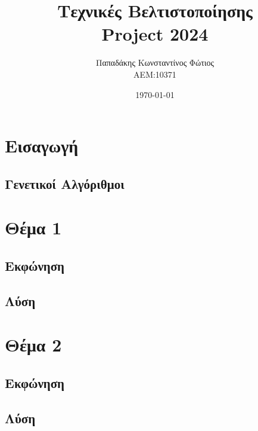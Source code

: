 \documentclass[twocolumn]{report}
\begin{document}

\title{\Huge \bfseries Τεχνικές Βελτιστοποίησης \\ Project 2024} %
\author{Παπαδάκης Κωνσταντίνος Φώτιος\vspace{0.5cm} \\  ΑΕΜ:10371} %
\date{\today}
\maketitle

\tableofcontents

\chapter{Εισαγωγή}
\section{Γενετικοί Αλγόριθμοι}


% 
\chapter{Θέμα 1}
\section{Εκφώνηση}

\section{Λύση}


% 
\chapter{Θέμα 2}
\section{Εκφώνηση}

\section{Λύση}
\end{document}
